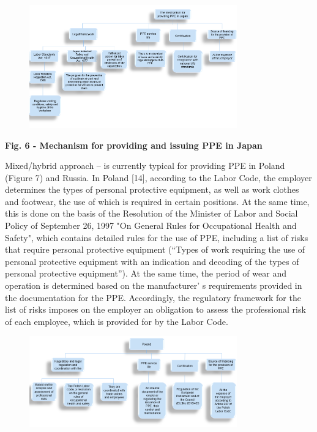 {\begin{figure}[H]
	\centering
	\includegraphics[width=0.8\textwidth]{media/chem2/image6}
	\caption*{}
\end{figure}


{\bfseries Fig. 6 - Mechanism for providing and issuing PPE in Japan}

Mixed/hybrid approach -- is currently typical for providing PPE in
Poland (Figure 7) and Russia. In Poland {[}14{]}, according to the Labor
Code, the employer determines the types of personal protective
equipment, as well as work clothes and footwear, the use of which is
required in certain positions. At the same time, this is done on the
basis of the Resolution of the Minister of Labor and Social Policy of
September 26, 1997 "On General Rules for Occupational Health and
Safety", which contains detailed rules for the use of PPE, including a
list of risks that require personal protective equipment (``Types of
work requiring the use of personal protective equipment with an
indication and decoding of the types of personal protective
equipment''). At the same time, the period of wear and operation is
determined based on the manufacturer' s requirements
provided in the documentation for the PPE. Accordingly, the regulatory
framework for the list of risks imposes on the employer an obligation to
assess the professional risk of each employee, which is provided for by
the Labor Code.

\begin{figure}[H]
	\centering
	\includegraphics[width=0.8\textwidth]{media/chem2/image7}
	\caption*{}
\end{figure}


}
